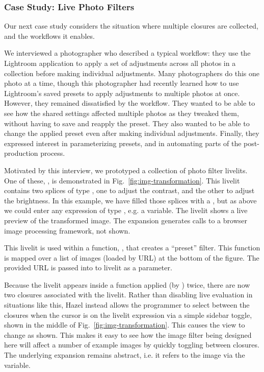 \subsubsection{Case Study: Live Photo Filters}\label{sec:image-transformation}
Our next case study 
considers the situation where multiple closures are collected, and 
the workflows it enables. 

We interviewed a photographer 
who described a typical workflow: 
they use the Lightroom application to 
apply a set of adjustments 
across all photos in a collection before making 
individual adjustments. 
Many photographers do this one photo at a time,
though this photographer had recently learned how to
use Lightroom's saved presets to 
apply adjustments to multiple photos at once.
However, they remained dissatisfied by the workflow.
They wanted to be able to see how the shared settings affected 
multiple photos as they tweaked them, without having to 
save and reapply the preset.
They also wanted to be able to change the applied preset
even after making individual adjustments.
Finally, they 
expressed interest in parameterizing  
presets, and in automating parts of the post-production process. 





Motivated by this interview, 
we prototyped a collection of photo filter livelits.
One of these, , is demonstrated in Fig.~\ref{fig:img-transformation}. 
This livelit contains two splices of type ,
one to adjust the contrast, and the other to adjust the brightness.
In this example, we have filled those splices with a , but 
as above we could enter any expression of type , e.g. a variable. 
The livelit shows a live preview of the transformed image.
The expansion generates calls to a browser image processing framework, 
not shown.

This livelit is used within a function, , that creates a ``preset'' filter. 
This function is mapped over a list of images (loaded by URL) at the bottom of the figure. 
The provided URL is passed into to livelit as a parameter.

Because the livelit appears inside a function applied (by ) twice, 
there are now two closures associated with the livelit. 
Rather than disabling live evaluation in situations like 
this, Hazel instead allows the programmer to select between the closures when 
the cursor is on the livelit expression via a simple sidebar toggle,
shown in the middle of Fig.~\ref{fig:img-transformation}.
This causes the view to change as shown. 
This makes it easy to see how the image filter being designed here will affect a
number of example images by quickly toggling between closures. 
The underlying expansion remains abstract, i.e. it refers to the image via the  variable.

